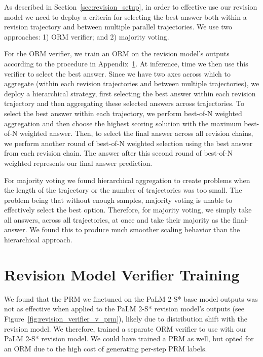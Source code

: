 \documentclass[11pt, letterpaper, logo]{googledeepmind}
\begin{document}
As described in Section~\ref{sec:revision_setup}, in order to effective use our revision model we need to deploy a criteria for selecting the best answer both within a revision trajectory and between multiple parallel trajectories. We use two approaches: 1) ORM verifier; and 2) majority voting.

For the ORM verifier, we train an ORM on the revision model's outputs according to the procedure in Appendix~\ref{app:revision_verifier}. At inference, time we then use this verifier to select the best answer. Since we have two axes across which to aggregate (within each revision trajectories and between multiple trajectories), we deploy a hierarchical strategy, first selecting the best answer within each revision trajectory and then aggregating these selected answers across trajectories. To select the best answer within each trajectory, we perform best-of-N weighted aggregation and then choose the highest scoring solution with the maximum best-of-N weighted answer. Then, to select the final answer across all revision chains, we perform another round of best-of-N weighted selection using the best answer from each revision chain. The answer after this second round of best-of-N weighted represents our final answer prediction.

For majority voting we found hierarchical aggregation to create problems when the length of the trajectory or the number of trajectories was too small. The problem being that without enough samples, majority voting is unable to effectively select the best option. Therefore, for majority voting, we simply take all answers, across all trajectories, at once and take their majority as the final-answer. We found this to produce much smoother scaling behavior than the hierarchical approach.

\section{Revision Model Verifier Training}
\label{app:revision_verifier}

We found that the PRM we finetuned on the PaLM 2-S* base model outputs was not as effective when applied to the PaLM 2-S* revision model's outputs (see Figure~\ref{fig:revision_verifier_v_prm}), likely due to distribution shift with the revision model. We therefore, trained a separate ORM verifier to use with our PaLM 2-S* revision model. We could have trained a PRM as well, but opted for an ORM due to the high cost of generating per-step PRM labels.
\end{document}
